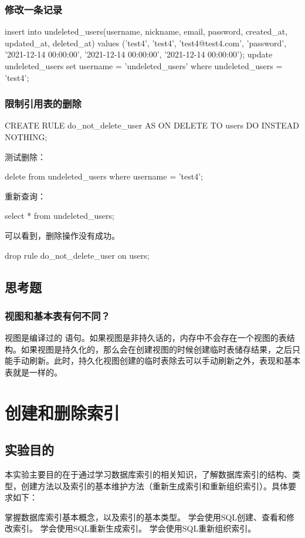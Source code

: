 \documentclass{ctexrep}
\begin{document}
\subsection{修改一条记录}
\begin{run}
    insert into undeleted_users(username, nickname, email, password,  created_at, updated_at, deleted_at)
    values ('test4', 'test4', 'test4@test4.com', 'password',  '2021-12-14 00:00:00', '2021-12-14 00:00:00', '2021-12-14 00:00:00');
    update undeleted_users set username = 'undeleted_users' where undeleted_users = 'test4';
\end{run}

\subsection{限制引用表的删除}
\begin{run}
    CREATE RULE do_not_delete_user AS ON DELETE TO users DO INSTEAD NOTHING;
\end{run}
测试删除：
\begin{run}
    delete from undeleted_users where username = 'test4';
\end{run}
重新查询：
\begin{run}
    select * from undeleted_users;
\end{run}
可以看到，删除操作没有成功。
\begin{runsilent}
    drop rule do_not_delete_user on users;
\end{runsilent}
\section{思考题}
\subsection*{视图和基本表有何不同？}
视图是编译过的  语句。如果视图是非持久话的，内存中不会存在一个视图的表结构。如果视图是持久化的，那么会在创建视图的时候创建临时表储存结果，之后只能手动刷新。此时，持久化视图创建的临时表除去可以手动刷新之外，表现和基本表就是一样的。

\chapter{创建和删除索引}
\section{实验目的}

本实验主要目的在于通过学习数据库索引的相关知识，了解数据库索引的结构、类型，创建方法以及索引的基本维护方法（重新生成索引和重新组织索引）。具体要求如下：
\begin{outline}
    \1 掌握数据库索引基本概念，以及索引的基本类型。
    \1 学会使用SQL创建、查看和修改索引。
    \1 学会使用SQL重新生成索引。
    \1 学会使用SQL重新组织索引。
\end{outline}
\end{document}
